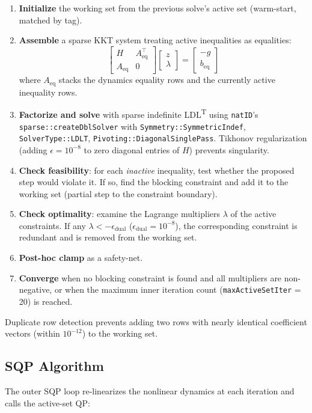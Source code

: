 ﻿\documentclass[11pt,a4paper]{article}
\begin{document}
\begin{enumerate}[leftmargin=1.2cm]
  \item \textbf{Initialize} the working set from the previous solve's active set (warm-start, matched by tag).
  \item \textbf{Assemble} a sparse KKT system treating active inequalities as equalities:
  \[
  \begin{bmatrix} H & A_{\text{eq}}^\top \\ A_{\text{eq}} & 0 \end{bmatrix}
  \begin{bmatrix} z \\ \lambda \end{bmatrix}
  =
  \begin{bmatrix} -g \\ b_{\text{eq}} \end{bmatrix}
  \]
  where $A_{\text{eq}}$ stacks the dynamics equality rows and the currently active inequality rows.
  \item \textbf{Factorize and solve} with sparse indefinite LDL\textsuperscript{T} using \texttt{natID}'s \texttt{sparse::createDblSolver} with \texttt{Symmetry::SymmetricIndef}, \texttt{SolverType::LDLT}, \texttt{Pivoting::DiagonalSinglePass}. Tikhonov regularization (adding $\epsilon = 10^{-8}$ to zero diagonal entries of $H$) prevents singularity.
  \item \textbf{Check feasibility}: for each \emph{inactive} inequality, test whether the proposed step would violate it. If so, find the blocking constraint and add it to the working set (partial step to the constraint boundary).
  \item \textbf{Check optimality}: examine the Lagrange multipliers $\lambda$ of the active constraints. If any $\lambda < -\epsilon_{\text{dual}}$ ($\epsilon_{\text{dual}} = 10^{-8}$), the corresponding constraint is redundant and is removed from the working set.
  \item \textbf{Post-hoc clamp} as a safety-net.
  \item \textbf{Converge} when no blocking constraint is found and all multipliers are non-negative, or when the maximum inner iteration count (\texttt{maxActiveSetIter} = 20) is reached.
\end{enumerate}

Duplicate row detection prevents adding two rows with nearly identical coefficient vectors (within $10^{-12}$) to the working set.

\subsection{SQP Algorithm}
The outer SQP loop re-linearizes the nonlinear dynamics at each iteration and calls the active-set QP:
\end{document}
